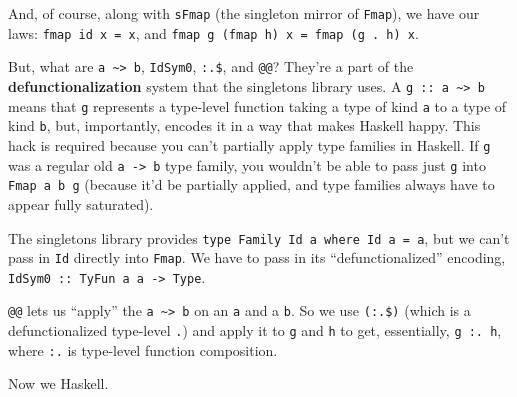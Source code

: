 \documentclass[]{article}
\begin{document}
And, of course, along with \texttt{sFmap} (the singleton mirror of
\texttt{Fmap}), we have our laws: \texttt{fmap\ id\ x\ =\ x}, and
\texttt{fmap\ g\ (fmap\ h)\ x\ =\ fmap\ (g\ .\ h)\ x}.

But, what are \texttt{a\ \textasciitilde{}\textgreater{}\ b}, \texttt{IdSym0},
\texttt{:.\$}, and \texttt{@@}? They're a part of the
\textbf{defunctionalization} system that the singletons library uses. A
\texttt{g\ ::\ a\ \textasciitilde{}\textgreater{}\ b} means that \texttt{g}
represents a type-level function taking a type of kind \texttt{a} to a type of
kind \texttt{b}, but, importantly, encodes it in a way that makes Haskell happy.
This hack is required because you can't partially apply type families in
Haskell. If \texttt{g} was a regular old \texttt{a\ -\textgreater{}\ b} type
family, you wouldn't be able to pass just \texttt{g} into \texttt{Fmap\ a\ b\ g}
(because it'd be partially applied, and type families always have to appear
fully saturated).

The singletons library provides
\texttt{type\ Family\ Id\ a\ where\ Id\ a\ =\ a}, but we can't pass in
\texttt{Id} directly into \texttt{Fmap}. We have to pass in its
``defunctionalized'' encoding,
\texttt{IdSym0\ ::\ TyFun\ a\ a\ -\textgreater{}\ Type}.

\texttt{@@} lets us ``apply'' the \texttt{a\ \textasciitilde{}\textgreater{}\ b}
on an \texttt{a} and a \texttt{b}. So we use \texttt{(:.\$)} (which is a
defunctionalized type-level \texttt{.}) and apply it to \texttt{g} and
\texttt{h} to get, essentially, \texttt{g\ :.\ h}, where \texttt{:.} is
type-level function composition.

Now we Haskell.
\end{document}
